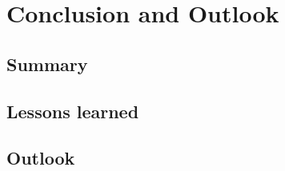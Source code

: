 \chapter{Conclusion and Outlook}
\label{ch:conclusion}

\section{Summary}

\section{Lessons learned}

\section{Outlook}
